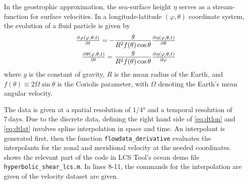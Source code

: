 \documentclass{article}
\begin{document}
In the geostrophic approximation, the sea-surface height $\eta$ serves as a stream-function for surface velocities. In a longitude-latitude $(\varphi,\theta)$ coordinate system, the evolution of a fluid particle is given by
\begin{eqnarray}
\pd{\varphi(\varphi,\theta,t)}{t} = -\frac{g}{R^2 f(\theta) \cos\theta} \pd{\eta(\varphi,\theta,t)}{\theta}\label{eq:dtlon}\\
\pd{\theta(\varphi,\theta,t)}{t} = \frac{g}{R^2 f(\theta) \cos\theta}\pd{\eta(\varphi,\theta,t)}{\varphi}
\label{eq:dtlat}
\end{eqnarray}
where $g$ is the constant of gravity, $R$ is the mean radius of the Earth, and $f(\theta) \equiv 2\Omega\sin\theta$ is the Coriolis parameter, with $\Omega$ denoting the Earth's mean angular velocity.

The data is given at a spatial resolution of $1/4°$ and a temporal resolution of $7\,\mathrm{days}$. Due to the discrete data, defining the right hand side of \cref{eq:dtlon} and \cref{eq:dtlat} involves spline interpolation in space and time. An interpolant is generated first, then the function \lstinline!flowdata_derivative! evaluates the interpolants for the zonal and meridional velocity at the needed coordinates.  shows the relevant part of the code in LCS Tool's ocean demo file \lstinline!hyperbolic_shear_lcs.m!. In lines 8-11, the commands for the interpolation are given of the velocity dataset are given.
\end{document}
